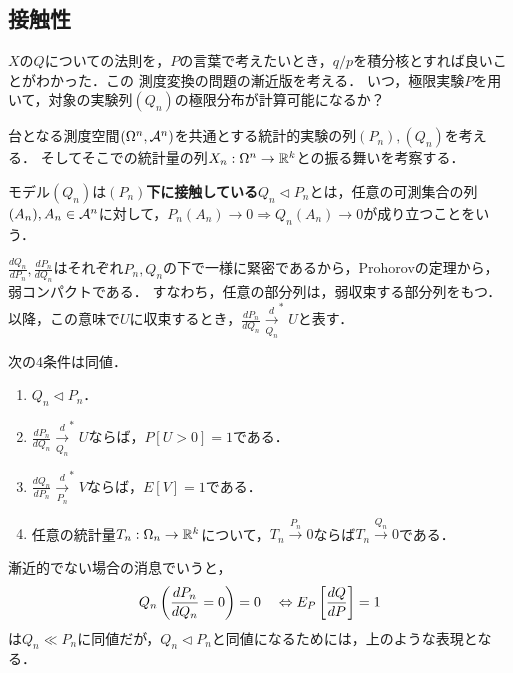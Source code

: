 \documentclass[uplatex,dvipdfmx]{jsreport}
\begin{document}
\subsection{接触性}

\begin{tcolorbox}[colframe=ForestGreen, colback=ForestGreen!10!white,breakable,colbacktitle=ForestGreen!40!white,coltitle=black,fonttitle=\bfseries\sffamily,
title=]
    $X$の$Q$についての法則を，$P$の言葉で考えたいとき，$q/p$を積分核とすれば良いことがわかった．この
    測度変換の問題の漸近版を考える．
    いつ，極限実験$P$を用いて，対象の実験列$(Q_n)$の極限分布が計算可能になるか？
\end{tcolorbox}

\begin{notation}
    台となる測度空間$(\Omega^n,\mathcal{A}^n)$を共通とする統計的実験の列$(P_n),(Q_n)$を考える．
    そしてそこでの統計量の列$X_n:\Omega^n\to\mathbb{R}^k$との振る舞いを考察する．
\end{notation}

\begin{definition}[contiguous]
    モデル$(Q_n)$は\textbf{$(P_n)$下に接触している}$Q_n\triangleleft P_n$とは，任意の可測集合の列$(A_n),A_n\in\mathcal{A}^n$に対して，$P_n(A_n)\to0\Rightarrow Q_n(A_n)\to0$が成り立つことをいう．
\end{definition}

\begin{remark}
    $\frac{dQ_n}{dP_n},\frac{dP_n}{dQ_n}$はそれぞれ$P_n,Q_n$の下で一様に緊密であるから，Prohorovの定理から，弱コンパクトである．
    すなわち，任意の部分列は，弱収束する部分列をもつ．
    以降，この意味で$U$に収束するとき，$\frac{dP_n}{dQ_n}\xrightarrow[Q_n]{d}^*U$と表す．
\end{remark}

\begin{lemma}
    次の4条件は同値．
    \begin{enumerate}
        \item $Q_n\triangleleft P_n$．
        \item $\frac{dP_n}{dQ_n}\xrightarrow[Q_n]{d}^*U$ならば，$P[U>0]=1$である．
        \item $\frac{dQ_n}{dP_n}\xrightarrow[P_n]{d}^*V$ならば，$E[V]=1$である．
        \item 任意の統計量$T_n:\Omega_n\to\mathbb{R}^k$について，$T_n\xrightarrow{P_n}0$ならば$T_n\xrightarrow{Q_n}0$である．
    \end{enumerate}
\end{lemma}
\begin{remarks}
    漸近的でない場合の消息でいうと，
    \[Q_n\left(\frac{dP_n}{dQ_n}=0\right)=0\quad\Leftrightarrow E_P\left[\frac{dQ}{dP}\right]=1\]
    は$Q_n\ll P_n$に同値だが，$Q_n\triangleleft P_n$と同値になるためには，上のような表現となる．
\end{remarks}
\end{document}
